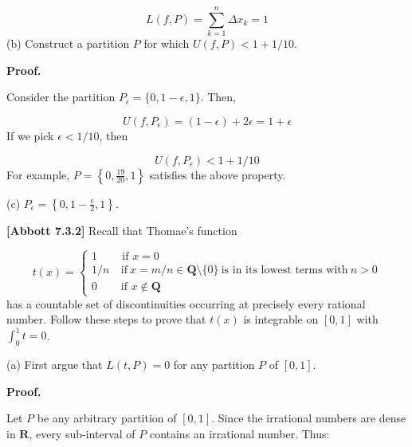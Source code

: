 \documentclass[10pt]{article}
\begin{document}
\begin{equation*}
L( f,P) =\sum _{k=1}^{n} \Delta x_{k} =1
\end{equation*}
(b) Construct a partition $\displaystyle P$ for which $\displaystyle U( f,P) < 1+1/10$. 



\textbf{Proof.}



Consider the partition $\displaystyle P_{\epsilon } =\{0,1-\epsilon ,1\}$. Then,


\begin{equation*}
U( f,P_{\epsilon }) =( 1-\epsilon ) +2\epsilon =1+\epsilon 
\end{equation*}
If we pick $\displaystyle \epsilon < 1/10$, then


\begin{equation*}
U( f,P_{\epsilon }) < 1+1/10
\end{equation*}
For example, $\displaystyle P=\left\{0,\frac{19}{20} ,1\right\}$ satisfies the above property.

(c) $P_\epsilon = \left\{0,1-\frac{\epsilon}{2},1\right\}$.



\textbf{[Abbott 7.3.2] }Recall that Thomae's function 


\begin{equation*}
t( x) =\begin{cases}
1 & \text{ if } x=0\\
1/n & \ \text{if} \ x=m/n\in \mathbf{Q} \setminus \{0\} \ \text{is in its lowest terms with} \ n >0\\
0 & \ \text{if } x\notin \mathbf{Q}
\end{cases}
\end{equation*}
has a countable set of discontinuities occurring at precisely every rational number. Follow these steps to prove that $\displaystyle t( x)$ is integrable on $\displaystyle [ 0,1]$ with $\displaystyle \int _{0}^{1} t=0$.

(a) First argue that $\displaystyle L( t,P) =0$ for any partition $\displaystyle P$ of $\displaystyle [ 0,1]$.



\textbf{Proof.}



Let $\displaystyle P$ be any arbitrary partition of $\displaystyle [ 0,1]$. Since the irrational numbers are dense in $\displaystyle \mathbf{R}$, every sub-interval of $\displaystyle P$ contains an irrational number. Thus:
\end{document}
